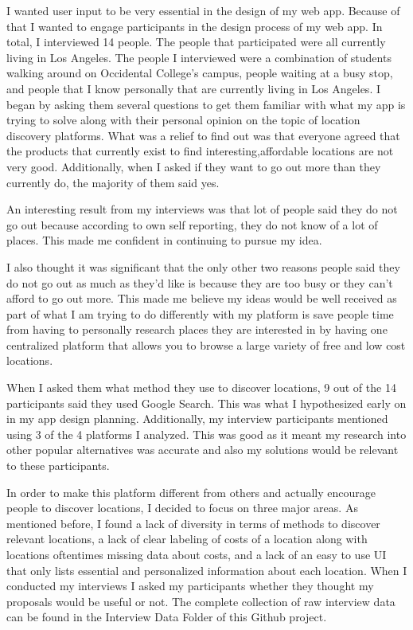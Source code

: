 \documentclass[12pt,twocolumn]{article}
\begin{document}
I wanted user input to be very essential in the design of my web app. Because of that I wanted to engage participants in the design process of my web app. In total, I interviewed 14 people. The people that participated were all currently living in Los Angeles. The people I interviewed were a combination of students walking around on Occidental College’s campus, people waiting at a busy stop, and people that I know personally that are currently living in Los Angeles.  I began by asking them several questions to get them familiar with what my app is trying to solve along with their  personal opinion on the topic of location discovery platforms. What was a relief to find out was that everyone agreed that the products that currently exist to find interesting,affordable locations are not very good. Additionally, when I asked if they want to go out more than they currently do, the majority of them said yes. 

An interesting result from my interviews was that lot of people said they do not go out because according to own self reporting, they do not know of a lot of places. This made me confident in continuing to pursue my idea.

 I also thought it was significant that the only other two reasons people said they do not go out as much as they'd like is because they are too busy or they can’t afford to go out more. This made me believe my ideas would be well received as part of what I am trying to do differently with my platform is save people time from having to personally research places they are interested in by having one centralized platform that allows you to browse a large variety of free and low cost locations. 

When I asked them what method they use to discover locations, 9 out of the 14 participants said they used Google Search. This was what I hypothesized early on in my app design planning.  Additionally, my interview participants mentioned using 3 of the 4 platforms I analyzed. This was good as it meant my research into other popular alternatives was accurate and also my solutions would be relevant to these participants.

In order to make this platform different from others and actually encourage people to discover locations, I decided to focus on three major areas. As mentioned before, I found a lack of diversity in terms of methods to discover relevant locations, a lack of clear labeling of costs of a location along with locations oftentimes missing data about costs, and a lack of an easy to use UI that only lists essential and personalized information about each location. When I conducted my interviews I asked my participants whether they thought my proposals would be useful or not.  The complete collection of raw interview data can be found in the Interview Data Folder of this Github project. 
\end{document}
